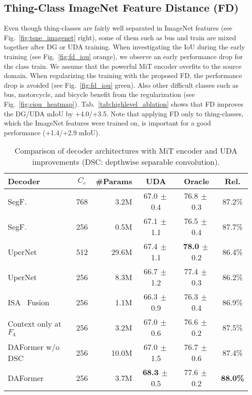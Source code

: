\documentclass[journal,compsoc]{IEEEtran}
\newcommand{\spm}[1]{\tiny{$\,\pm$#1}}
\begin{document}
\subsection{Thing-Class ImageNet Feature Distance (FD)}
\label{sec:exp_fd}

Even though thing-classes are fairly well separated in ImageNet features (see Fig.~\ref{fig:tsne_imagenet} right), some of them such as bus and train are mixed together after DG or UDA training.
When investigating the IoU during the early training (see Fig.~\ref{fig:fd_iou} orange), we observe an early performance drop for the class train. We assume that the powerful MiT encoder overfits to the source domain. When regularizing the training with the proposed FD, the performance drop is avoided (see Fig.~\ref{fig:fd_iou} green). 
Also other difficult classes such as bus, motorcycle, and bicycle benefit from the regularization (see Fig.~\ref{fig:ciou_heatmap}). Tab.~\ref{tab:highlevel_ablation} shows that FD improves the DG/UDA mIoU by +4.0/+3.5. Note that applying FD only to thing-classes, which the ImageNet features were trained on, is important for a good performance (+1.4/+2.9 mIoU).

\begin{table}
\centering
\caption{Comparison of decoder architectures with MiT encoder and UDA improvements (DSC: depthwise separable convolution).}
\label{tab:decoder_fusion}
\footnotesize
\setlength{\tabcolsep}{3.5pt}
\begin{tabular}{lcrccc}
\toprule
            Decoder & $C_e$ & \#Params &          UDA &         Oracle &   Rel. \\
\midrule
        SegF.~\cite{xie2021segformer} & 768 &  3.2M & 67.0\spm{0.4} & 76.8\spm{0.3} & 87.2\% \\
        SegF.~\cite{xie2021segformer} & 256 &  0.5M & 67.1\spm{1.1} & 76.5\spm{0.4} & 87.7\% \\
        UperNet~\cite{xiao2018unified} & 512 & 29.6M & 67.4\spm{1.1} & \textbf{78.0}\spm{0.2} & 86.4\% \\
        UperNet~\cite{xiao2018unified} & 256 &  8.3M & 66.7\spm{1.2} & 77.4\spm{0.3} & 86.2\% \\
ISA~\cite{huang2019interlaced} Fusion & 256 &  1.1M & 66.3\spm{0.9} & 76.3\spm{0.4} & 86.9\% \\
Context only at $F_4$ & 256 & 3.2M & 67.0\spm{0.6} & 76.6\spm{0.2} & 87.5\% \\
                        DAFormer w/o DSC & 256 & 10.0M & 67.0\spm{1.5} & 76.7\spm{0.6} & 87.4\% \\
                DAFormer & 256 &  3.7M & \textbf{68.3}\spm{0.5} & 77.6\spm{0.2} & \textbf{88.0\%} \\
\bottomrule
\end{tabular}
\end{table} 
\end{document}
